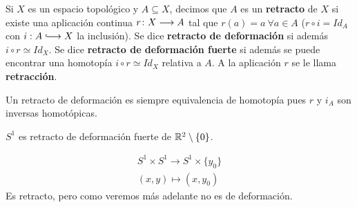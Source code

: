 \documentclass[GTS.tex]{subfiles}
\begin{document}
\begin{defi} Si $X$ es un espacio topológico y $A\subseteq X$, decimos que $A$ es un \textbf{retracto} de $X$ si existe una aplicación continua $r\colon{X}\longrightarrow{A}$ tal que $r(a)=a\ \forall a\in A$ ($r\circ i=Id_A$ con $i:A\longhookarrow X$ la inclusión). Se dice \textbf{retracto de deformación} si además $i\circ r\simeq Id_X$. Se dice \textbf{retracto de deformación fuerte} si además se puede encontrar una homotopía $i\circ r\simeq Id_X$ relativa a $A$. A la aplicación $r$ se le llama \textbf{retracción}.
\end{defi}

\begin{nota} 
Un retracto de deformación es siempre equivalencia de homotopía pues $r$ y $i_A$ son inversas homotópicas.
\end{nota}

\begin{consec} $S^1$ es retracto de deformación fuerte de $\mathbb{R}^2\setminus\{0\}$.
\end{consec}

\begin{ej}
\begin{gather*}
S^1\times S^1\longrightarrow S^1\times\{y_0\}\\
(x,y)\longmapsto (x,y_0)
\end{gather*}
Es retracto, pero como veremos más adelante no es de deformación.
\end{ej}
\end{document}
